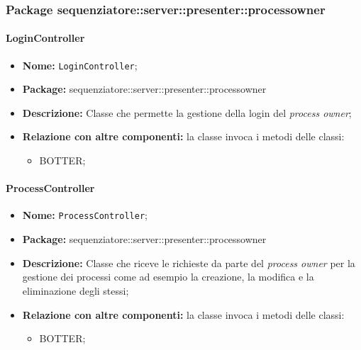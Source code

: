 \subsubsection{Package sequenziatore::server::presenter::processowner}
\paragraph{LoginController}
	\begin{itemize}
		\item \textbf{Nome:} \texttt{LoginController};
		\item \textbf{Package:} sequenziatore::server::presenter::processowner
		\item \textbf{Descrizione:} Classe che permette la gestione della login del \textit{process owner};
		\item \textbf{Relazione con altre componenti:} la classe invoca i metodi delle classi:
		\begin{itemize}
			\item BOTTER;
		\end{itemize}
	\end{itemize}

\paragraph{ProcessController}
	\begin{itemize}
		\item \textbf{Nome:} \texttt{ProcessController};
		\item \textbf{Package:} sequenziatore::server::presenter::processowner
		\item \textbf{Descrizione:} Classe che riceve le richieste da parte del \textit{process owner} per la gestione dei processi come ad esempio la creazione, la modifica e la eliminazione degli stessi;
		\item \textbf{Relazione con altre componenti:} la classe invoca i metodi delle classi:
		\begin{itemize}
			\item BOTTER;
		\end{itemize}
	\end{itemize}
